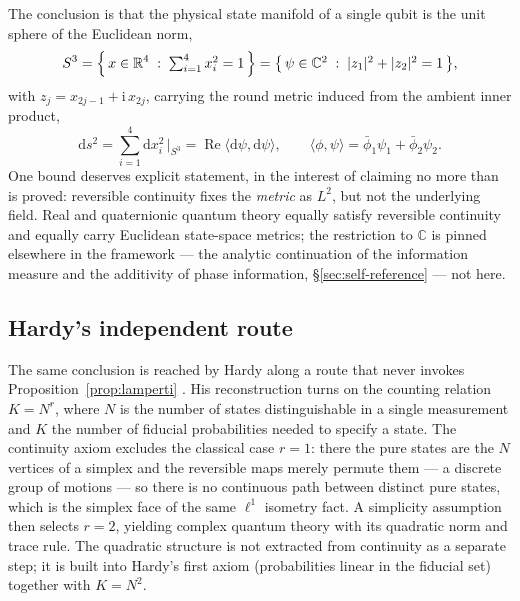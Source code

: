 The conclusion is that the physical state manifold of a single qubit is the unit sphere of the
Euclidean norm,
\begin{equation}
  S^{3}=\Bigl\{\,x\in\mathbb{R}^{4}\;:\;\textstyle\sum_{i=1}^{4}x_{i}^{2}=1\,\Bigr\}
  =\bigl\{\,\psi\in\mathbb{C}^{2}\;:\;\lvert z_{1}\rvert^{2}+\lvert z_{2}\rvert^{2}=1\,\bigr\},
\end{equation}
with $z_{j}=x_{2j-1}+\mathrm{i}\,x_{2j}$, carrying the round metric induced from the ambient
inner product,
\begin{equation}
  \mathrm{d}s^{2}=\sum_{i=1}^{4}\mathrm{d}x_{i}^{2}\,\Big|_{S^{3}}
  =\operatorname{Re}\langle\mathrm{d}\psi,\mathrm{d}\psi\rangle,
  \qquad
  \langle\phi,\psi\rangle=\bar\phi_{1}\psi_{1}+\bar\phi_{2}\psi_{2}.
\end{equation}
One bound deserves explicit statement, in the interest of claiming no more than is proved:
reversible continuity fixes the \emph{metric} as $L^{2}$, but not the underlying field. Real and
quaternionic quantum theory equally satisfy reversible continuity and equally carry Euclidean
state-space metrics; the restriction to $\mathbb{C}$ is pinned elsewhere in the framework ---
the analytic continuation of the information measure and the additivity of phase information,
\S\ref{sec:self-reference} --- not here.

\subsection{Hardy's independent route}
\label{sec:hardy-route}

The same conclusion is reached by Hardy along a route that never invokes
Proposition~\ref{prop:lamperti} \autocite{Hardy2001a}. His reconstruction turns on the counting
relation $K=N^{r}$, where $N$ is the number of states distinguishable in a single measurement
and $K$ the number of fiducial probabilities needed to specify a state. The continuity axiom
excludes the classical case $r=1$: there the pure states are the $N$ vertices of a simplex and
the reversible maps merely permute them --- a discrete group of motions --- so there is no
continuous path between distinct pure states, which is the simplex face of the same $\ell^{1}$
isometry fact. A simplicity assumption then selects $r=2$, yielding complex quantum theory with
its quadratic norm and trace rule. The quadratic structure is not extracted from continuity as a
separate step; it is built into Hardy's first axiom (probabilities linear in the fiducial set)
together with $K=N^{2}$.

